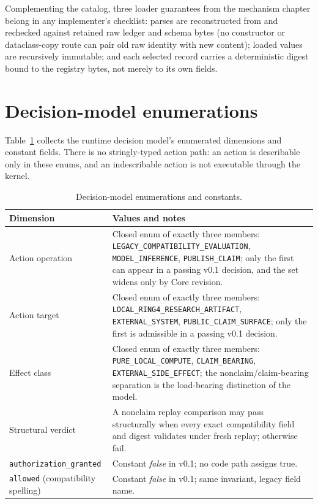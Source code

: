 Complementing the catalog, three loader guarantees from the mechanism chapter belong in any implementer's checklist: parses are reconstructed from and rechecked against retained raw ledger and schema bytes (no constructor or dataclass-copy route can pair old raw identity with new content); loaded values are recursively immutable; and each selected record carries a deterministic digest bound to the registry bytes, not merely to its own fields.

\section{Decision-model enumerations}\label{tables:decision}

Table~\ref{tables:tab:decision} collects the runtime decision model's enumerated dimensions and constant fields. There is no stringly-typed action path: an action is describable only in these enums, and an indescribable action is not executable through the kernel.

\begin{table}[htbp]
\centering
\caption{Decision-model enumerations and constants.}
\label{tables:tab:decision}
\begin{tabular}{@{}p{}p{}@{}}
\toprule
Dimension & Values and notes \\
\midrule
Action operation & Closed enum of exactly three members: \texttt{LEGACY\_COMPATIBILITY\_EVALUATION}, \texttt{MODEL\_INFERENCE}, \texttt{PUBLISH\_CLAIM}; only the first can appear in a passing v0.1 decision, and the set widens only by Core revision. \\
\addlinespace
Action target & Closed enum of exactly three members: \texttt{LOCAL\_RING4\_RESEARCH\_ARTIFACT}, \texttt{EXTERNAL\_SYSTEM}, \texttt{PUBLIC\_CLAIM\_SURFACE}; only the first is admissible in a passing v0.1 decision. \\
\addlinespace
Effect class & Closed enum of exactly three members: \texttt{PURE\_LOCAL\_COMPUTE}, \texttt{CLAIM\_BEARING}, \texttt{EXTERNAL\_SIDE\_EFFECT}; the nonclaim/claim-bearing separation is the load-bearing distinction of the model. \\
\addlinespace
Structural verdict & A nonclaim replay comparison may pass structurally when every exact compatibility field and digest validates under fresh replay; otherwise fail. \\
\addlinespace
\texttt{authorization\_granted} & Constant \emph{false} in v0.1; no code path assigns true. \\
\addlinespace
\texttt{allowed} (compatibility spelling) & Constant \emph{false} in v0.1; same invariant, legacy field name. \\
\bottomrule
\end{tabular}
\end{table}


